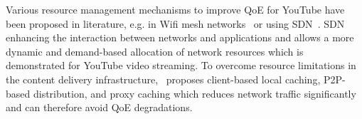 Various resource management mechanisms to improve \gls{QoE} for YouTube have been proposed in literature, e.g. in Wifi mesh networks~\cite{Wamser2013} or using \gls{SDN}~\cite{Zinner2014}. \gls{SDN} enhancing the interaction between networks and applications and allows a more dynamic and demand-based allocation of network resources which is demonstrated for YouTube video streaming.
To overcome resource limitations in the content delivery infrastructure,~\cite{Zink2008} proposes client-based local caching, \gls{P2P}-based distribution, and proxy caching which reduces network traffic significantly and can therefore avoid \gls{QoE} degradations.